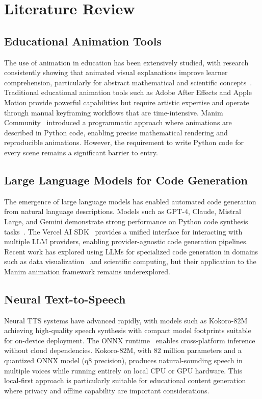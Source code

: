 \documentclass[12pt,a4paper,twoside,openright]{report}
\begin{document}
\chapter{Literature Review}

\section{Educational Animation Tools}

The use of animation in education has been extensively studied, with research consistently showing that animated visual explanations improve learner comprehension, particularly for abstract mathematical and scientific concepts~\cite{mayer2009multimedia}. Traditional educational animation tools such as Adobe After Effects and Apple Motion provide powerful capabilities but require artistic expertise and operate through manual keyframing workflows that are time-intensive. Manim Community~\cite{manim2024} introduced a programmatic approach where animations are described in Python code, enabling precise mathematical rendering and reproducible animations. However, the requirement to write Python code for every scene remains a significant barrier to entry.

\section{Large Language Models for Code Generation}

The emergence of large language models has enabled automated code generation from natural language descriptions. Models such as GPT-4, Claude, Mistral Large, and Gemini demonstrate strong performance on Python code synthesis tasks~\cite{chen2021codex}. The Vercel AI SDK~\cite{vercelai2025} provides a unified interface for interacting with multiple LLM providers, enabling provider-agnostic code generation pipelines. Recent work has explored using LLMs for specialized code generation in domains such as data visualization~\cite{maddigan2022chat2vis} and scientific computing, but their application to the Manim animation framework remains underexplored.

\section{Neural Text-to-Speech}

Neural TTS systems have advanced rapidly, with models such as Kokoro-82M~\cite{kokoro2025} achieving high-quality speech synthesis with compact model footprints suitable for on-device deployment. The ONNX runtime~\cite{onnx2023} enables cross-platform inference without cloud dependencies. Kokoro-82M, with 82 million parameters and a quantized ONNX model (q8 precision), produces natural-sounding speech in multiple voices while running entirely on local CPU or GPU hardware. This local-first approach is particularly suitable for educational content generation where privacy and offline capability are important considerations.
\end{document}
